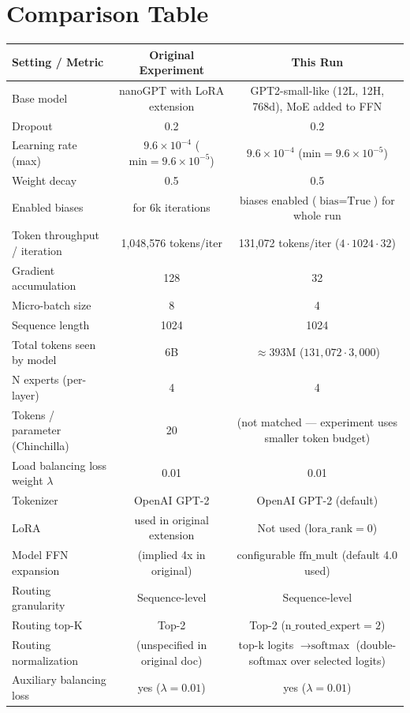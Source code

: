 \documentclass{article}
\begin{document}
\section{Comparison Table}
\begin{table}[h!]
\centering
\begin{tabular}{@{}lcc@{}}
\toprule
\textbf{Setting / Metric} & \textbf{Original Experiment} & \textbf{This Run} \\
\midrule
Base model & nanoGPT with LoRA extension & GPT2-small-like (12L, 12H, 768d), MoE added to FFN \\
Dropout & 0.2 & 0.2 \\
Learning rate (max) & $9.6 \times 10^{-4}$ ($\text{min} = 9.6 \times 10^{-5}$) & $9.6 \times 10^{-4}$ ($\text{min} = 9.6 \times 10^{-5}$) \\
Weight decay & 0.5 & 0.5 \\
Enabled biases & for 6k iterations & biases enabled ($\text{bias}=\text{True}$) for whole run \\
Token throughput / iteration & 1,048,576 tokens/iter & 131,072 tokens/iter ($4 \cdot 1024 \cdot 32$) \\
Gradient accumulation & 128 & 32 \\
Micro-batch size & 8 & 4 \\
Sequence length & 1024 & 1024 \\
Total tokens seen by model & 6B & $\approx 393$M ($131,072 \cdot 3,000$) \\
N experts (per-layer) & 4 & 4 \\
Tokens / parameter (Chinchilla) & 20 & (not matched — experiment uses smaller token budget) \\
Load balancing loss weight $\lambda$ & 0.01 & 0.01 \\
Tokenizer & OpenAI GPT-2 & OpenAI GPT-2 (default) \\
LoRA & used in original extension & Not used ($\text{lora\_rank}=0$) \\
Model FFN expansion & (implied 4x in original) & configurable $\text{ffn\_mult}$ (default 4.0 used) \\
Routing granularity & Sequence-level & Sequence-level \\
Routing top-K & Top-2 & Top-2 ($\text{n\_routed\_expert}=2$) \\
Routing normalization & (unspecified in original doc) & top-k logits $\to \text{softmax}$ (double-softmax over selected logits) \\
Auxiliary balancing loss & yes ($\lambda=0.01$) & yes ($\lambda=0.01$) \\

\end{tabular}
\end{table}
\end{document}
